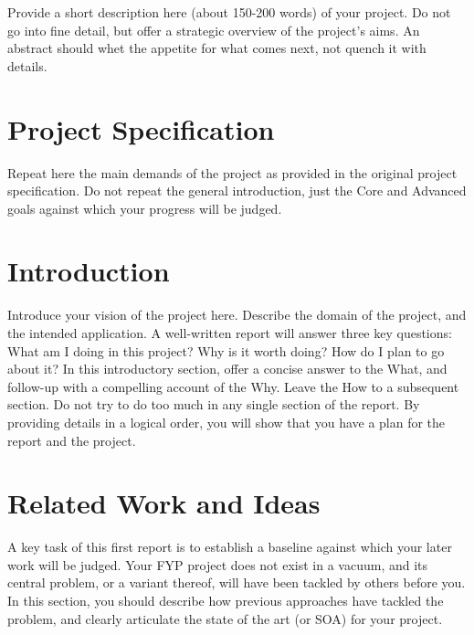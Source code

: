 \documentclass[]{UCD_CS_FYP_Report}
\begin{document}
\maketitle


\tableofcontents


\abstract
Provide a short description here (about 150-200 words) of your project. Do not go into fine detail, but offer a strategic overview of the project’s aims. An abstract should whet the appetite for what comes next, not quench it with details.


\chapter{Project Specification}
Repeat here the main demands of the project as provided in the original project specification. Do not repeat the general introduction, just the Core and Advanced goals against which your progress will be judged.


\chapter{Introduction}
Introduce your vision of the project here. Describe the domain of the project, and the intended application. A well-written report will answer three key questions: What am I doing in this project? Why is it worth doing? How do I plan to go about it? In this introductory section, offer a concise answer to the What, and follow-up with a compelling account of the Why. Leave the How to a subsequent section. Do not try to do too much in any single section of the report. By providing details in a logical order, you will show that you have a plan for the report and the project.

\chapter{Related Work and Ideas}
A key task of this first report is to establish a baseline against which your later work will be judged. Your FYP project does not exist in a vacuum, and its central problem, or a variant thereof, will have been tackled by others before you. In this section, you should describe how previous approaches have tackled the problem, and clearly articulate the state of the art (or SOA) for your project.
\end{document}

